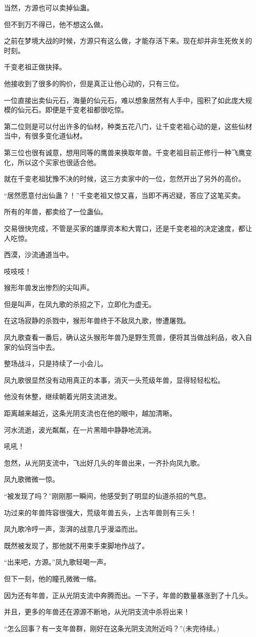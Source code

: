 \begin{this_body}
当然，方源也可以卖掉仙蛊。

但不到万不得已，他不想这么做。

之前在梦境大战的时候，方源只有这么做，才能存活下来。现在却并非生死攸关的时刻。

千变老祖正做抉择。

他接收到了很多的购价，但是真正让他心动的，只有三位。

一位直接出卖仙元石，海量的仙元石，难以想象居然有人手中，囤积了如此庞大规模的仙元石。即便是千变老祖都很吃惊。

第二位则是可以付出许多的仙材，种类五花八门，让千变老祖心动的是，这些仙材当中，有很多变化道仙材。

第三位也很有诚意，想用同等的鹰兽来换取年兽。千变老祖目前正修行一种飞鹰变化，所以这个买家也很适合他。

就在千变老祖犹豫不决的时候，这三方卖家中的一位，忽然开出了另外的高价。

“居然愿意付出仙蛊？！”千变老祖又惊又喜，当即不再迟疑，答应了这笔买卖。

所有的年兽，都卖给了一位蛊仙。

交易很快完成，不管是买家的雄厚资本和大胃口，还是千变老祖的决定速度，都让人吃惊。

西漠，沙流通道当中。

吱吱吱！

猴形年兽发出惨烈的尖叫声。

但是叫声，在凤九歌的杀招之下，立即化为虚无。

在这场寂静的杀戮中，猴形年兽终于不敌凤九歌，惨遭屠戮。

凤九歌查看一番后，确认这头猴形年兽乃是野生荒兽，便将其当做战利品，收入自家的仙窍当中去。

整场战斗，只是持续了一小会儿。

凤九歌很显然没有动用真正的本事，消灭一头荒级年兽，显得轻轻松松。

他没有休整，继续朝着光阴支流进发。

距离越来越近，这条光阴支流也在他的眼中，越加清晰。

河水流逝，波光粼粼，在一片黑暗中静静地流淌。

吼吼！

忽然，从光阴支流中，飞出好几头的年兽出来，一齐扑向凤九歌。

凤九歌微微一惊。

“被发现了吗？”刚刚那一瞬间，他感受到了明显的仙道杀招的气息。

功过来的年兽阵容很强大，荒级年兽五头，上古年兽则有三头！

凤九歌冷哼一声，澎湃的战意几乎漫溢而出。

既然被发现了，那他就不用束手束脚地作战了。

“出来吧，方源。”凤九歌轻喝一声。

但下一刻，他的瞳孔微微一缩。

因为还有年兽，正从光阴支流中奔腾而出。一下子，年兽的数量暴涨到了十几头。

并且，更多的年兽还在源源不断地，从光阴支流中杀将出来！

“怎么回事？有一支年兽群，刚好在这条光阴支流附近吗？”(未完待续。)

\end{this_body}

